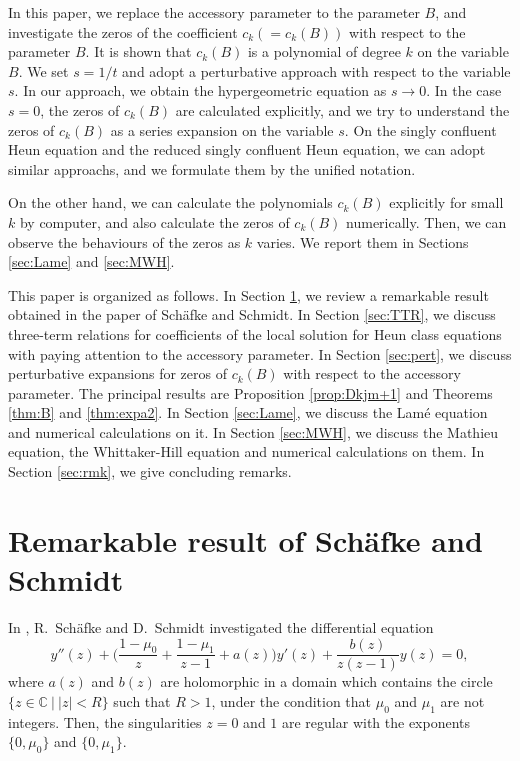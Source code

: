 \documentclass[12pt]{amsart}
\newcommand{\C}{\mathbb {C}}     %
\numberwithin{equation}{section}
\theoremstyle{definition}
\theoremstyle{remark}
\begin{document}
In this paper, we replace the accessory parameter to the parameter $B$, and investigate the zeros of the coefficient $c_k (= c_k (B)) $ with respect to the parameter $B$.
It is shown that $c_k (B) $ is a polynomial of degree $k$ on the variable $B$.
We set $s=1/t$ and adopt a perturbative approach with respect to the variable $s$.
In our approach, we obtain the hypergeometric equation as $s \to 0$.
In the case $s=0$, the zeros of $c_k (B)$ are calculated explicitly, and we try to understand the zeros of $c_k (B)$ as a series expansion on the variable $s$.
On the singly confluent Heun equation and the reduced singly confluent Heun equation, we can adopt similar approachs, and we formulate them by the unified notation.

On the other hand, we can calculate the polynomials $c_k (B) $ explicitly for small $k$ by computer, and also calculate the zeros of $c_k (B)$ numerically.
Then, we can observe the behaviours of the zeros as $k$ varies.
We report them in Sections \ref{sec:Lame} and \ref{sec:MWH}.

This paper is organized as follows.
In Section \ref{sec:SS}, we review a remarkable result obtained in the paper \cite{SS} of Sch{\"a}fke and Schmidt.
In Section \ref{sec:TTR}, we discuss three-term relations for coefficients of the local solution for Heun class equations with paying attention to the accessory parameter.
In Section \ref{sec:pert}, we discuss perturbative expansions for zeros of $c_k (B) $ with respect to the accessory parameter.
The principal results are Proposition \ref{prop:Dkjm+1} and Theorems \ref{thm:B} and \ref{thm:expa2}.
In Section \ref{sec:Lame}, we discuss the Lam\'e equation and numerical calculations on it.
In Section \ref{sec:MWH}, we discuss the Mathieu equation, the Whittaker-Hill equation and numerical calculations on them.
In Section \ref{sec:rmk}, we give concluding remarks.


\section{Remarkable result of Sch{\"a}fke and Schmidt} \label{sec:SS}

In \cite{SS}, R.~Sch{\"a}fke and D.~Schmidt investigated the differential equation
\begin{equation}
 y''(z) + \Big( \frac{1-\mu _0}{z} +\frac{1-\mu _1}{z-1} + a(z) \Big) y'(z) + \frac{b(z)}{z(z-1)} y(z) = 0,
\label{eq:SS}
\end{equation}
where $a(z)$ and $b(z)$ are holomorphic in a domain which contains the circle $\{ z \in \C \: | \: |z|<R \} $ such that $R>1$, under the condition that $\mu_0 $ and $\mu _1$ are not integers.
Then, the singularities $z=0$ and $1$ are regular with the exponents $\{0 , \mu _0 \} $ and $\{0 , \mu _1 \} $.
\end{document}

